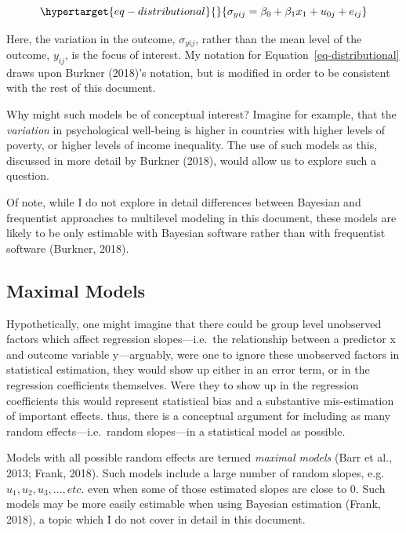 \documentclass[
  letterpaper,
  DIV=11,
  numbers=noendperiod]{scrreprt}
\begin{document}
\begin{equation}\protect\hypertarget{eq-distributional}{}{\sigma_{yij} = \beta_0 + \beta_1 x_1 + u_{0j} + e_{ij}}\label{eq-distributional}\end{equation}

Here, the variation in the outcome, \(\sigma_{yij}\), rather than the
mean level of the outcome, \(y_{ij}\), is the focus of interest. My
notation for Equation~\ref{eq-distributional} draws upon Burkner
(2018)'s notation, but is modified in order to be consistent with the
rest of this document.

Why might such models be of conceptual interest? Imagine for example,
that the \emph{variation} in psychological well-being is higher in
countries with higher levels of poverty, or higher levels of income
inequality. The use of such models as this, discussed in more detail by
Burkner (2018), would allow us to explore such a question.

Of note, while I do not explore in detail differences between Bayesian
and frequentist approaches to multilevel modeling in this document,
these models are likely to be only estimable with Bayesian software
rather than with frequentist software (Burkner, 2018).

\hypertarget{maximal-models}{%
\subsection{Maximal Models}\label{maximal-models}}

Hypothetically, one might imagine that there could be group level
unobserved factors which affect regression slopes---i.e.~the
relationship between a predictor x and outcome variable y---arguably,
were one to ignore these unobserved factors in statistical estimation,
they would show up either in an error term, or in the regression
coefficients themselves. Were they to show up in the regression
coefficients this would represent statistical bias and a substantive
mis-estimation of important effects. thus, there is a conceptual
argument for including as many random effects---i.e.~random slopes---in
a statistical model as possible.

Models with all possible random effects are termed \emph{maximal models}
(Barr et al., 2013; Frank, 2018). Such models include a large number of
random slopes, e.g.~\(u_1, u_2, u_3, ..., etc.\) even when some of those
estimated slopes are close to 0. Such models may be more easily
estimable when using Bayesian estimation (Frank, 2018), a topic which I
do not cover in detail in this document.
\end{document}
